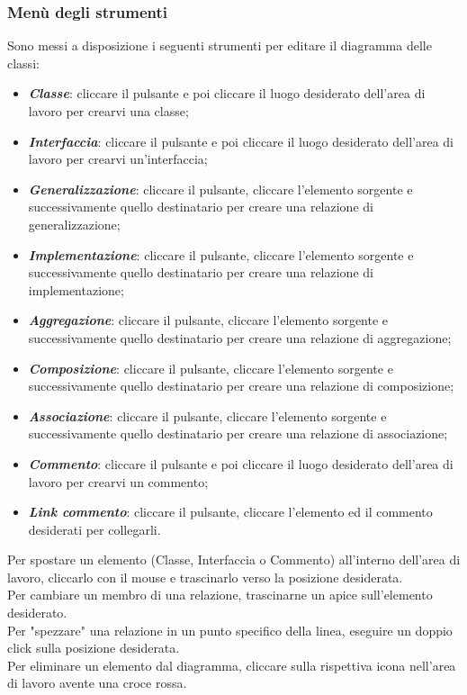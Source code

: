 \documentclass[../ManualeUtente.tex]{subfiles}
\begin{document}
			\subsubsection{Menù degli strumenti}
				Sono messi a disposizione i seguenti strumenti per editare il diagramma delle classi:
				\begin{itemize}
					\item \textit{\textbf{Classe}}: cliccare il pulsante e poi cliccare il luogo desiderato
					dell'area di lavoro per crearvi una classe;
					\item \textit{\textbf{Interfaccia}}: cliccare il pulsante e poi cliccare il luogo desiderato
					dell'area di lavoro per crearvi un'interfaccia;
					\item \textit{\textbf{Generalizzazione}}: cliccare il pulsante, cliccare l'elemento sorgente
					e successivamente quello destinatario per creare una relazione di generalizzazione;
					\item \textit{\textbf{Implementazione}}: cliccare il pulsante, cliccare l'elemento sorgente
					e successivamente quello destinatario per creare una relazione di implementazione;
					\item \textit{\textbf{Aggregazione}}: cliccare il pulsante, cliccare l'elemento sorgente
					e successivamente quello destinatario per creare una relazione di aggregazione;
					\item \textit{\textbf{Composizione}}: cliccare il pulsante, cliccare l'elemento sorgente
					e successivamente quello destinatario per creare una relazione di composizione;
					\item \textit{\textbf{Associazione}}: cliccare il pulsante, cliccare l'elemento sorgente
					e successivamente quello destinatario per creare una relazione di associazione;
					\item \textit{\textbf{Commento}}: cliccare il pulsante e poi cliccare il luogo desiderato
					dell'area di lavoro per crearvi un commento;
					\item \textit{\textbf{Link commento}}: cliccare il pulsante, cliccare l'elemento ed il
					commento desiderati per collegarli.
				\end{itemize}
				Per spostare un elemento (Classe, Interfaccia o Commento) all'interno dell'area di lavoro,
				cliccarlo con il mouse e trascinarlo verso la posizione desiderata.\\
				Per cambiare un membro di una relazione, trascinarne un apice sull'elemento
				desiderato.\\
				Per "spezzare" una relazione in un punto specifico della linea, eseguire un doppio click sulla
				posizione desiderata.\\
				Per eliminare un elemento dal diagramma, cliccare sulla rispettiva icona nell'area di lavoro
				avente una croce rossa.
\end{document}
